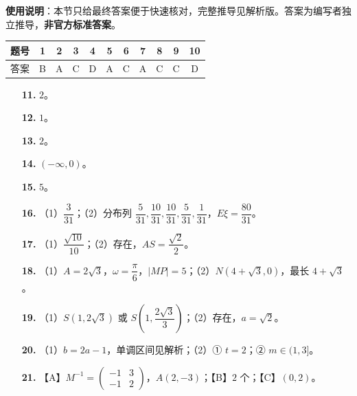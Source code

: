 
\begin{gknotice}
\textbf{使用说明}：本节只给最终答案便于快速核对，完整推导见解析版。答案为编写者独立推导，\textbf{非官方标准答案}。
\end{gknotice}

\begin{center}\begin{tabular}{ccccccccccc}
\toprule
题号 & 1 & 2 & 3 & 4 & 5 & 6 & 7 & 8 & 9 & 10 \\
\midrule
答案 & B & A & C & D & A & C & A & C & C & D \\
\bottomrule
\end{tabular}\end{center}

\begin{itemize}[leftmargin=2.6em]
  \item[\textbf{11.}] $2$。
  \item[\textbf{12.}] $1$。
  \item[\textbf{13.}] $2$。
  \item[\textbf{14.}] $(-\infty,0)$。
  \item[\textbf{15.}] $5$。
\end{itemize}

\begin{itemize}[leftmargin=2.6em]
  \item[\textbf{16.}] （1）$\dfrac3{31}$；（2）分布列 $\dfrac5{31},\dfrac{10}{31},\dfrac{10}{31},\dfrac5{31},\dfrac1{31}$，$E\xi=\dfrac{80}{31}$。
  \item[\textbf{17.}] （1）$\dfrac{\sqrt{10}}{10}$；（2）存在，$AS=\dfrac{\sqrt2}2$。
  \item[\textbf{18.}] （1）$A=2\sqrt3$，$\omega=\dfrac\pi6$，$|MP|=5$；（2）$N(4+\sqrt3,0)$，最长 $4+\sqrt3$。
  \item[\textbf{19.}] （1）$S(1,2\sqrt3)$ 或 $S\left(1,\dfrac{2\sqrt3}3\right)$；（2）存在，$a=\sqrt2$。
  \item[\textbf{20.}] （1）$b=2a-1$，单调区间见解析；（2）① $t=2$；② $m\in(1,3]$。
  \item[\textbf{21.}] 【A】$M^{-1}=\begin{pmatrix}-1&3\\-1&2\end{pmatrix}$，$A(2,-3)$；【B】$2$ 个；【C】$(0,2)$。
\end{itemize}
